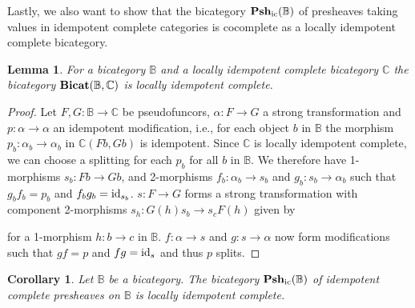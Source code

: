 \documentclass[12pt,oneside,reqno,a4paper]{article}
\newtheorem{corollary}[theorem]{Corollary}
\newtheorem{lemma}[theorem]{Lemma}
\theoremstyle{definition}
\newcommand{\Bicat}{\textbf{\textup{Bicat}}}
\newcommand{\Pshic}[1]{\textbf{\textup{Psh}}_\textup{ic}(#1)}
\newcommand{\id}{\textup{id}}
\newcommand{\bB}{\mathbb{B}}
\newcommand{\bC}{\mathbb{C}}
\begin{document}
Lastly, we also want to show that the bicategory $\Pshic{\bB}$ of presheaves taking values in idempotent complete categories is cocomplete as a locally idempotent complete bicategory.

\begin{lemma}
For a bicategory $\bB$ and a locally idempotent complete bicategory $\bC$ the bicategory $\Bicat(\bB,\bC)$ is locally idempotent complete.
\end{lemma}

\begin{proof}
Let $F,G:\bB\to \bC$ be pseudofuncors, $\alpha:F\to G$ a strong transformation and $p:\alpha\to \alpha$ an idempotent modification, i.e., for each object $b$ in $\bB$ the morphism $p_b:\alpha_b\to \alpha_b$ in $\bC(Fb,Gb)$ is idempotent. Since $\bC$ is locally idempotent complete, we can choose a splitting for each $p_b$ for all $b$ in $\bB$. We therefore have 1-morphisms $s_b:Fb\to Gb$, and 2-morphisms $f_b:\alpha_b\to s_b$ and $g_b:s_b\to \alpha_b$ such that $g_b f_b=p_b$ and $f_b g_b=\id_{s_b}$. $s:F\to G$ forms a strong transformation with component 2-morphisms $s_h:G(h)s_b\to s_c F(h)$ given by
\begin{center}
\end{center}
for a 1-morphism $h:b\to c$ in $\bB$. $f:\alpha\to s$ and $g:s\to \alpha$ now form modifications such that $gf=p$ and $fg=\id_s$ and thus $p$ splits.
\end{proof}

\begin{corollary} \label{Pshlic}
Let $\bB$ be a bicategory. The bicategory $\Pshic{\bB}$ of idempotent complete presheaves on $\bB$ is locally idempotent complete.
\end{corollary}
\end{document}
